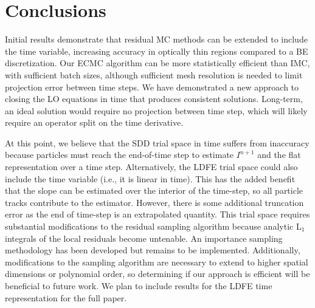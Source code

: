 \documentclass{anstrans}
\begin{document}
\section{Conclusions}

Initial results demonstrate that residual MC methods can be extended to include
the time variable, increasing accuracy in optically thin regions compared to a
BE discretization.   Our ECMC algorithm can be more statistically efficient
than IMC, with sufficient batch sizes, although sufficient mesh resolution is needed to limit projection
error between time steps.  We have demonstrated a new approach to
closing the LO equations in time that produces consistent solutions. Long-term, an ideal solution
would require no projection between time step, which will likely require an operator split
on the time derivative.

At this point, we believe that the SDD trial space in time suffers from inaccuracy because particles must
reach the end-of-time step to estimate $I^{n+1}$ and the flat representation over a time step.  Alternatively, the LDFE trial space
could also include the time variable (i.e., it is linear in time).  This has the added
benefit that the slope can be estimated over the interior of the time-step, so all
particle tracks contribute to the estimator.  However, there is some additional truncation
error as the end of time-step is an extrapolated quantity.  This trial space requires substantial modifications to the residual sampling
algorithm because analytic L$_1$ integrals of the local residuals become untenable.  An
importance sampling methodology has been developed but remains to be implemented.  Additionally, modifications to the sampling
algorithm are necessary to extend to higher spatial dimensions or polynomial order, so determining if our
approach is efficient will be beneficial to future work. We plan to include results
for the LDFE time representation for the full paper. 





\end{document}
